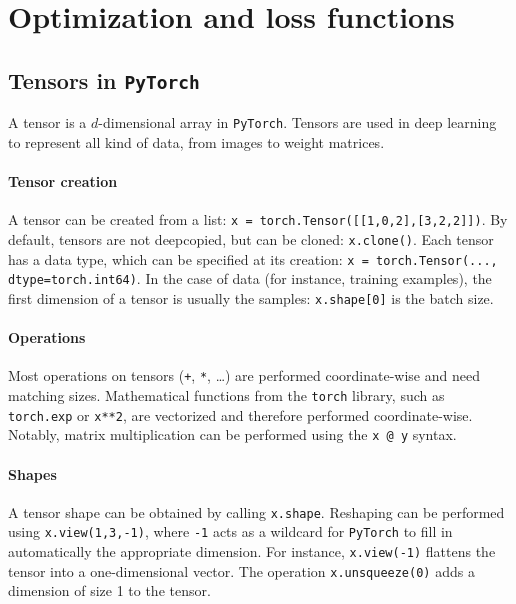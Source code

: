 \section{Optimization and loss functions}
\subsection{Tensors in \texttt{PyTorch}}
A tensor is a $d$-dimensional array in \texttt{PyTorch}. Tensors are used in deep learning to represent all kind of data, from images to weight matrices.

\paragraph*{Tensor creation}
A tensor can be created from a list: \texttt{x = torch.Tensor([[1,0,2],[3,2,2]])}. By default, tensors are not deepcopied, but can be cloned: \texttt{x.clone()}. Each tensor has a data type, which can be specified at its creation: \texttt{x = torch.Tensor(..., dtype=torch.int64)}. In the case of data (for instance, training examples), the first dimension of a tensor is usually the samples: \texttt{x.shape[0]} is the batch size.

\paragraph*{Operations}
Most operations on tensors (\texttt{+}, \texttt{*}, \dots) are performed coordinate-wise and need matching sizes. Mathematical functions from the \texttt{torch} library, such as \texttt{torch.exp} or \texttt{x**2}, are vectorized and therefore performed coordinate-wise. Notably, matrix multiplication can be performed using the \texttt{x @ y} syntax.

\paragraph*{Shapes}
A tensor shape can be obtained by calling \texttt{x.shape}. Reshaping can be performed using \texttt{x.view(1,3,-1)}, where \texttt{-1} acts as a wildcard for \texttt{PyTorch} to fill in automatically the appropriate dimension. For instance, \texttt{x.view(-1)} flattens the tensor into a one-dimensional vector. The operation \texttt{x.unsqueeze(0)} adds a dimension of size 1 to the tensor.

